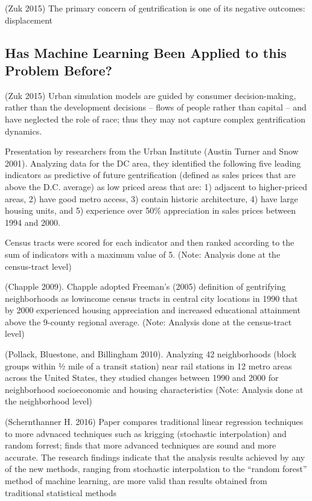 \documentclass[]{article}
\begin{document}
(Zuk 2015) The primary concern of gentrification is one of its negative
outcomes: displacement

\subsection{Has Machine Learning Been Applied to this Problem
Before?}\label{has-machine-learning-been-applied-to-this-problem-before}

(Zuk 2015) Urban simulation models are guided by consumer
decision-making, rather than the development decisions -- flows of
people rather than capital -- and have neglected the role of race; thus
they may not capture complex gentrification dynamics.

Presentation by researchers from the Urban Institute (Austin Turner and
Snow 2001). Analyzing data for the DC area, they identified the
following five leading indicators as predictive of future gentrification
(defined as sales prices that are above the D.C. average) as low priced
areas that are: 1) adjacent to higher-priced areas, 2) have good metro
access, 3) contain historic architecture, 4) have large housing units,
and 5) experience over 50\% appreciation in sales prices between 1994
and 2000.

Census tracts were scored for each indicator and then ranked according
to the sum of indicators with a maximum value of 5. (Note: Analysis done
at the census-tract level)

(Chapple 2009). Chapple adopted Freeman's (2005) definition of
gentrifying neighborhoods as lowincome census tracts in central city
locations in 1990 that by 2000 experienced housing appreciation and
increased educational attainment above the 9-county regional average.
(Note: Analysis done at the census-tract level)

(Pollack, Bluestone, and Billingham 2010). Analyzing 42 neighborhoods
(block groups within ½ mile of a transit station) near rail stations in
12 metro areas across the United States, they studied changes between
1990 and 2000 for neighborhood socioeconomic and housing characteristics
(Note: Analysis done at the neighborhood level)

(Schernthanner H. 2016) Paper compares traditional linear regression
techniques to more advnaced techniques such as krigging (stochastic
interpolation) and random forrest; finds that more advanced techniques
are sound and more accurate. The research findings indicate that the
analysis results achieved by any of the new methods, ranging from
stochastic interpolation to the ``random forest'' method of machine
learning, are more valid than results obtained from traditional
statistical methods
\end{document}
